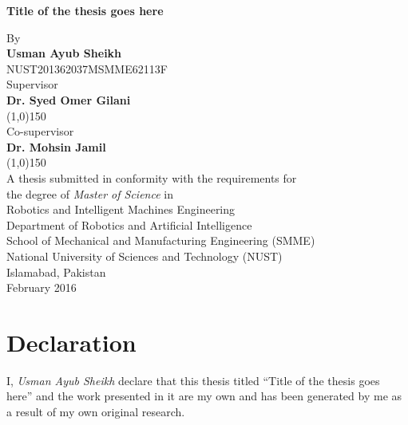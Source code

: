 \documentclass[11pt,a4paper]{report}
\numberwithin{equation}{section}
\begin{document}
    \newpage
    \begin{titlepage}
        \centering
        \huge{\textbf{Title of the thesis goes here}} \\ [0.2cm]
        \begin{figure}[ht!]
            \centering
            \def\svgwidth{0.3\columnwidth}
            
        \end{figure}
        \Large{By} \\
        \Large{\textbf{Usman Ayub Sheikh}} \\
        \Large{NUST201362037MSMME62113F} \\[0.2cm]
        \Large{Supervisor} \\
        \Large{\textbf{Dr. Syed Omer Gilani}} \\
        \line(1,0){150} \\
        \Large{Co-supervisor} \\
        \Large{\textbf{Dr. Mohsin Jamil}} \\
        \line(1,0){150} \\ [0.2cm]
        \Large{A thesis submitted in conformity with the requirements for \\
        the degree of \emph{Master of Science} in \\
        Robotics and Intelligent Machines Engineering} \\[0.2cm]
        \Large{Department of Robotics and Artificial Intelligence \\
        School of Mechanical and Manufacturing Engineering (SMME) \\
        National University of Sciences and Technology (NUST) \\
        Islamabad, Pakistan} \\
        \Large{February 2016}
    \end{titlepage}

    \newpage
    \chapter*{Declaration} %
    \label{cha:declaration}
    I, \textit{Usman Ayub Sheikh} declare that this thesis titled ``Title of the thesis goes here'' and the work presented in it are my own and has been generated by me as a result of my own original research. \\
\end{document}
